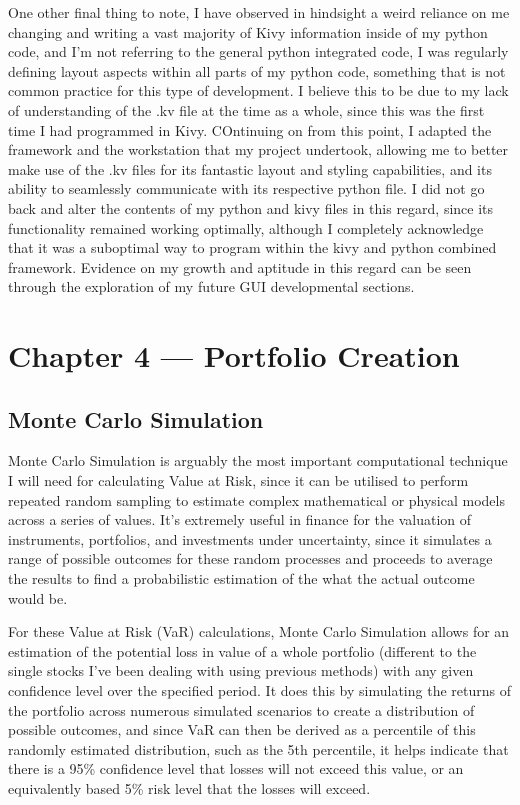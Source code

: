 \documentclass{article}
\begin{document}
One other final thing to note, I have observed in hindsight a weird reliance on me changing and writing a vast majority of Kivy information inside of my python code, and I'm not referring to the general python integrated code, I was regularly defining layout aspects within all parts of my python code, something that is not common practice for this type of development. I believe this to be due to my lack of understanding of the .kv file at the time as a whole, since this was the first time I had programmed in Kivy. COntinuing on from this point, I adapted the framework and the workstation that my project undertook, allowing me to better make use of the .kv files for its fantastic layout and styling capabilities, and its ability to seamlessly communicate with its respective python file. I did not go back and alter the contents of my python and kivy files in this regard, since its functionality remained working optimally, although I completely acknowledge that it was a suboptimal way to program within the kivy and python combined framework. Evidence on my growth and aptitude in this regard can be seen through the exploration of my future GUI developmental sections.\\\vspace{0.3cm}

\section{Chapter 4 --- Portfolio Creation}

\subsection{Monte Carlo Simulation}

Monte Carlo Simulation is arguably the most important computational technique I will need for calculating Value at Risk, since it can be utilised to perform repeated random sampling to estimate complex mathematical or physical models across a series of values. It's extremely useful in finance for the valuation of instruments, portfolios, and investments under uncertainty, since it simulates a range of possible outcomes for these random processes and proceeds to average the results to find a probabilistic estimation of the what the actual outcome would be.\\\vspace{0.3cm}

For these Value at Risk (VaR) calculations, Monte Carlo Simulation allows for an estimation of the potential loss in value of a whole portfolio (different to the single stocks I've been dealing with using previous methods) with any given confidence level over the specified period. It does this by simulating the returns of the portfolio across numerous simulated scenarios to create a distribution of possible outcomes, and since VaR can then be derived as a percentile of this randomly estimated distribution, such as the 5th percentile, it helps indicate that there is a 95\% confidence level that losses will not exceed this value, or an equivalently based 5\% risk level that the losses will exceed.\\\vspace{0.3cm}
\end{document}
